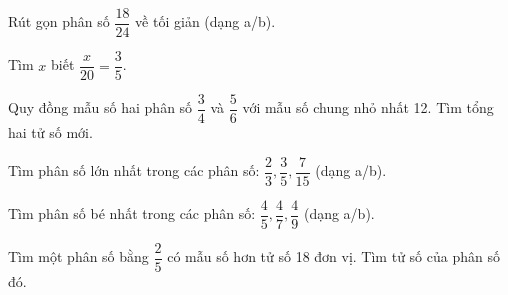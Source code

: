 \begin{ex} %
Rút gọn phân số $\dfrac{18}{24}$ về tối giản (dạng a/b).
\end{ex}

\begin{ex} %
Tìm $x$ biết $\dfrac{x}{20} = \dfrac{3}{5}$.
\end{ex}

\begin{ex} %
Quy đồng mẫu số hai phân số $\dfrac{3}{4}$ và $\dfrac{5}{6}$ với mẫu số chung nhỏ nhất 12. Tìm tổng hai tử số mới.
\end{ex}

\begin{ex} %
Tìm phân số lớn nhất trong các phân số: $\dfrac{2}{3}, \dfrac{3}{5}, \dfrac{7}{15}$ (dạng a/b).
\end{ex}

\begin{ex} %
Tìm phân số bé nhất trong các phân số: $\dfrac{4}{5}, \dfrac{4}{7}, \dfrac{4}{9}$ (dạng a/b).
\end{ex}

\begin{ex} %
Tìm một phân số bằng $\dfrac{2}{5}$ có mẫu số hơn tử số 18 đơn vị. Tìm tử số của phân số đó.
\end{ex}
